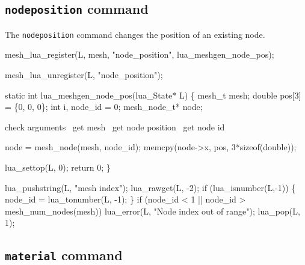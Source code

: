 \subsection{{\tt{}node{}position} command}

The {\tt{}node{}position} command changes the position of an existing node.

\nwenddocs{}\plusendmoddef
mesh_lua_register(L, mesh, "node_position", lua_meshgen_node_pos);
\nwendcode{}\nwdocspar

\nwenddocs{}\plusendmoddef
mesh_lua_unregister(L, "node_position");
\nwendcode{}\nwdocspar

\nwenddocs{}\plusendmoddef
static int lua_meshgen_node_pos(lua_State* L)
\{
    mesh_t mesh;
    double pos[3] = \{0, 0, 0\};
    int i, node_id = 0;
    mesh_node_t* node;

    \LA{}check arguments~{\nwtagstyle{}}\RA{}
    \LA{}get \code{}mesh\edoc{}~{\nwtagstyle{}}\RA{}
    \LA{}get node position~{\nwtagstyle{}}\RA{}
    \LA{}get node id~{\nwtagstyle{}}\RA{}

    node = mesh_node(mesh, node_id);
    memcpy(node->x, pos, 3*sizeof(double));

    lua_settop(L, 0);
    return 0;
\}

\nwendcode{}\nwdocspar

\nwenddocs{}\endmoddef
lua_pushstring(L, "mesh index");
lua_rawget(L, -2);
if (lua_isnumber(L,-1)) \{
     node_id = lua_tonumber(L, -1);
\}
if (node_id < 1 || node_id > mesh_num_nodes(mesh))
     lua_error(L, "Node index out of range");
lua_pop(L, 1);
\nwendcode{}\nwdocspar


\subsection{{\tt{}material} command}

